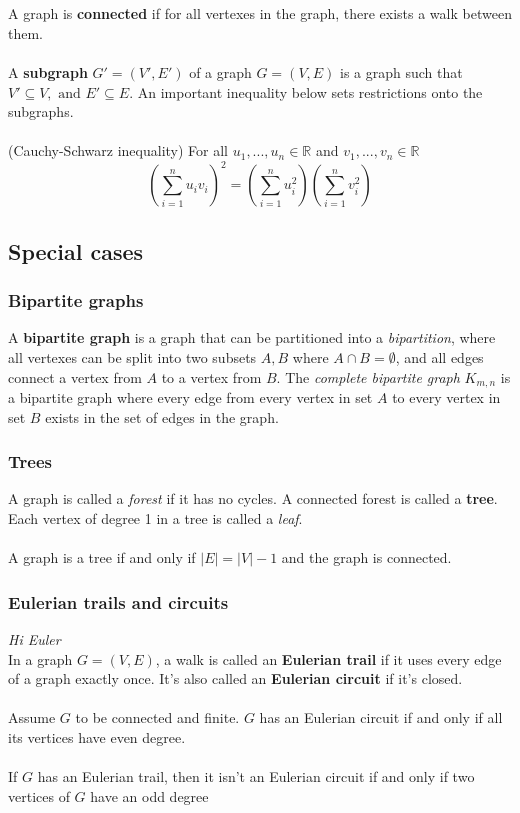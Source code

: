 \documentclass{article}
\begin{document}
\\\\
A graph is \textbf{connected} if for all vertexes in the graph, there exists a walk between them.
\\\\
A \textbf{subgraph} $G' =(V',E')$ of a graph $G=(V,E)$ is a graph such that $V'\subseteq V,\text{ and } E'\subseteq E$. An important inequality below sets restrictions onto the subgraphs.  
\\\\
(Cauchy-Schwarz inequality) For all $u_1,...,u_n\in \mathds{R}$ and $v_1,...,v_n\in \mathds{R}$
\[(\sum^n_{i=1}u_iv_i)^2 = (\sum^n_{i=1}u_i^2)(\sum^n_{i=1}v_i^2)\]
\subsection{Special cases}
\subsubsection{Bipartite graphs}
A \textbf{bipartite graph} is a graph that can be partitioned into a \textit{bipartition}, where all vertexes can be split into two subsets $A,B$ where $A\cap B = \emptyset$, and all edges connect a vertex from $A$ to a vertex from $B$. The \textit{complete bipartite graph} $K_{m,n}$ is a bipartite graph where every edge from every vertex in set $A$ to every vertex in set $B$ exists in the set of edges in the graph.
\subsubsection{Trees}
A graph is called a \textit{forest} if it has no cycles. A connected forest is called a \textbf{tree}. Each vertex of degree 1 in a tree is called a \textit{leaf}.
\\\\
A graph is a tree if and only if $|E|=|V|-1$ and the graph is connected.
\subsubsection{Eulerian trails and circuits}
\textit{Hi Euler}
\\
In a graph $G=(V,E)$, a walk is called an \textbf{Eulerian trail} if it uses every edge of a graph exactly once. It's also called an \textbf{Eulerian circuit} if it's closed.
\\\\
Assume $G$ to be connected and finite. $G$ has an Eulerian circuit if and only if all its vertices have even degree. 
\\\\
If $G$ has an Eulerian trail, then it isn't an Eulerian circuit if and only if two vertices of $G$ have an odd degree
\end{document}
